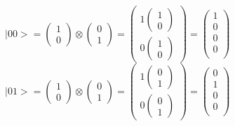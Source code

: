 \documentclass[11pt]{report}
\begin{document}
$|00> = \begin{pmatrix}
1 \\
0
\end{pmatrix}
\otimes
\begin{pmatrix}
0 \\
1
\end{pmatrix}
=
\begin{pmatrix}
1 \begin{pmatrix}1 \\
0\end{pmatrix} \\
0 \begin{pmatrix}1 \\
0\end{pmatrix}
\end{pmatrix} =
\begin{pmatrix}
1 \\
0 \\
0 \\
0 \\
\end{pmatrix}$ \\

$|01> = \begin{pmatrix}
1 \\
0
\end{pmatrix}
\otimes
\begin{pmatrix}
0 \\
1
\end{pmatrix}
=
\begin{pmatrix}
1 
\begin{pmatrix}
0 \\
1\end{pmatrix} \\

0 
\begin{pmatrix}
0 \\
1\end{pmatrix}

\end{pmatrix} =
\begin{pmatrix}
0 \\
1 \\
0 \\
0 \\
\end{pmatrix}$ \\
\end{document}
